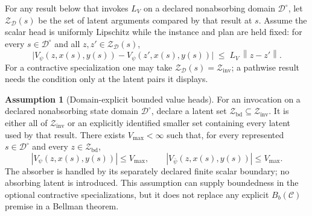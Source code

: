 \documentclass{article}
\theoremstyle{plain}
\theoremstyle{definition}
\newtheorem{assumption}[theorem]{Assumption}
\theoremstyle{remark}
\newcommand{\norm}[1]{\left\lVert #1 \right\rVert}
\begin{document}
For any result below that invokes $L_V$ on a declared nonabsorbing domain
$\mathcal D^\circ$, let $\mathcal Z_{\mathcal D}(s)$ be the set of latent
arguments compared by that result at $s$. Assume the scalar head is uniformly
Lipschitz while the instance and plan are held fixed: for every
$s\in\mathcal D^\circ$ and all $z,z'\in\mathcal Z_{\mathcal D}(s)$,
\begin{equation}
\bigl|V_\psi(z,x(s),y(s))-V_\psi(z',x(s),y(s))\bigr|
\;\le\;
L_V\,\norm{z-z'}.
\label{eq:LV_def}
\end{equation}
For a contractive specialization one may take
$\mathcal Z_{\mathcal D}(s)=\mathcal Z_{\mathrm{inv}}$; a pathwise result
needs the condition only at the latent pairs it displays.

\begin{assumption}[Domain-explicit bounded value heads]
\label{ass:bounded_value_head}
For an invocation on a declared nonabsorbing state domain
$\mathcal D^\circ$, declare a latent set
$\mathcal Z_{\mathrm{bd}}\subseteq\mathcal Z_{\mathrm{inv}}$. It is either
all of $\mathcal Z_{\mathrm{inv}}$ or an explicitly identified smaller set
containing every latent used by that result. There exists
$V_{\max}<\infty$ such that, for every represented
$s\in\mathcal D^\circ$ and every $z\in\mathcal Z_{\mathrm{bd}}$,
\begin{equation}
|V_\psi(z,x(s),y(s))|\le V_{\max},
\qquad
|V_{\bar\psi}(z,x(s),y(s))|\le V_{\max}.
\label{eq:bounded_value_heads_domain}
\end{equation}
The absorber is handled by its separately declared finite scalar boundary;
no absorbing latent is introduced. This assumption can supply boundedness in
the optional contractive specializations, but it does not replace any
explicit $B_b(\mathcal C)$ premise in a Bellman theorem.
\end{assumption}
\end{document}

